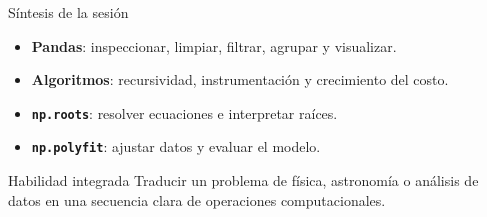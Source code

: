 \documentclass[10pt]{beamer}
\begin{document}
\begin{frame}{Síntesis de la sesión}
  \begin{itemize}
    \item \textbf{Pandas}: inspeccionar, limpiar, filtrar, agrupar y visualizar.
    \item \textbf{Algoritmos}: recursividad, instrumentación y crecimiento del costo.
    \item \textbf{\texttt{np.roots}}: resolver ecuaciones e interpretar raíces.
    \item \textbf{\texttt{np.polyfit}}: ajustar datos y evaluar el modelo.
  \end{itemize}

  \begin{block}{Habilidad integrada}
    Traducir un problema de física, astronomía o análisis de datos en una secuencia clara de operaciones computacionales.
  \end{block}
\end{frame}
\end{document}
